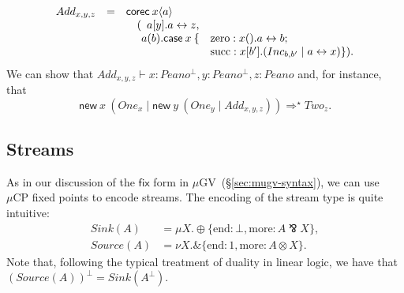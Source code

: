 \documentclass[orivec,envcountsame]{llncs}
\newcommand{\with}{\mathbin\binampersand}
\newcommand{\parr}{\mathbin\bindnasrepma}
\newcommand{\cpdual}[1]{#1^\perp}
\newcommand{\cptyp}[2]{#1 \vdash #2}
\newcommand{\mkwd}[1]{\mathsf{#1}}
\newcommand{\link}[2]{#1 \leftrightarrow #2}
\newcommand{\cut}[4]{\mkwd{new}\:#1 \: (#3 \mid #4)}
\newcommand{\clabel}[1]{\mathrm{#1}}
\newcommand{\lrkwd}{\mkwd{fix}}
\newcommand{\mucp}{$\mu\mathrm{CP}$\xspace}
\newcommand{\mugv}{$\mu\mathrm{GV}$\xspace}
\newcommand{\secref}[1]{(\S\ref{sec:#1})}
\begin{document}
{\small\[\begin{array}{rcl@{\hspace{0mm}}ll}
  Add_{x,y,z} & = & \mcl{3}{\mkwd{corec}\:x\langle a \rangle} \\
  & & \quad (&\mcl{2}{a[y].\link{a}{z},} \\
  & & & a(b).\mkwd{case}\:x\:\{&\clabel{zero}: x().\link{a}{b}; \\
  & & & & \clabel{succ}: x[b'].(Inc_{b,b'} \mid  \link{a}{x}) \}).
\end{array}\]}
We can show that $\cptyp{Add_{x,y,z}}{x:\cpdual{Peano}, y:\cpdual{Peano}, z:Peano}$ and, for instance,
that
%
{\small\[
  \cut{x}{Peano}{One_x}{\cut{y}{Peano}{One_y}{Add_{x,y,z}}} \Longrightarrow^\star Two_z.
\]}

\subsection{Streams}

As in our discussion of the $\lrkwd$ form in \mugv~\secref{mugv-syntax}, we can use \mucp fixed
points to encode streams.  The encoding of the stream type is quite intuitive:
\begin{align*}
  Sink(A) &= \mu X. \oplus \{ \clabel{end}: \bot, \clabel{more}: A \parr X \}, \\
  Source(A) &= \nu X. \with \{ \clabel{end}: 1, \clabel{more}: A \otimes X \}.
\end{align*}
Note that, following the typical treatment of duality in linear logic, we have that
$\cpdual{(Source(A))} = Sink(\cpdual{A})$.
\end{document}
